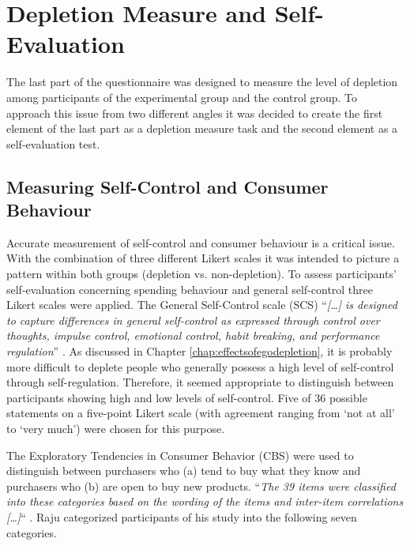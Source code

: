 \section{Depletion Measure and Self-Evaluation}\label{sec:depletion_measure_self_evaluation}
The last part of the questionnaire was designed to measure the level of depletion among participants of the experimental group and the control group. To approach this issue from two different angles it was decided to create the first element of the last part as a depletion measure task and the second element as a self-evaluation test.
\subsection{Measuring Self-Control and Consumer Behaviour}
Accurate measurement of self-control and consumer behaviour is a critical issue. With the combination of three different Likert scales it was intended to picture a pattern within both groups (depletion vs. non-depletion). To assess participants’ self-evaluation concerning spending behaviour and general self-control three Likert scales were applied. The General Self-Control scale (SCS) “\emph{[\ldots] is designed to capture differences in general self-control as expressed through control over thoughts, impulse control, emotional control, habit breaking, and performance regulation}” \citep{tangney2004high}. As discussed in Chapter \ref{chap:effectsofegodepletion}, it is probably more difficult to deplete people who generally possess a high level of self-control through self-regulation. Therefore, it seemed appropriate to distinguish between participants showing high and low levels of self-control. Five of 36 possible statements on a five-point Likert scale (with agreement ranging from ‘not at all’ to ‘very much’) were chosen for this purpose.\par
The Exploratory Tendencies in Consumer Behavior (CBS) \citep{raju1980optimum} were used to distinguish between purchasers who (a) tend to buy what they know and purchasers who (b) are open to buy new products. “\emph{The 39 items were classified into these categories based on the wording of the items and inter-item correlations [\ldots]}“ \citep{raju1980optimum}. Raju categorized participants of his study into the following seven categories.\par


